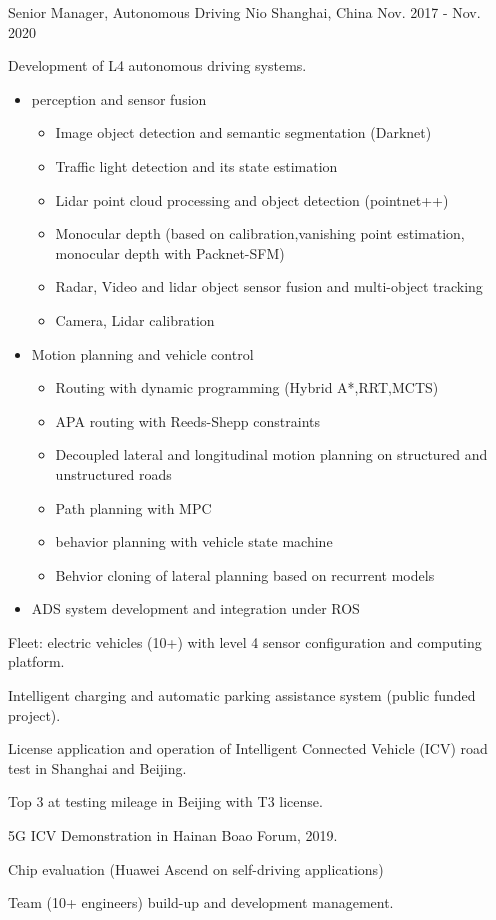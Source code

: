 \documentclass[../cv.tex]{subfiles}
\begin{document}
\begin{cventries}
	\cventry
	{Senior Manager, Autonomous Driving} %
	{Nio} %
	{Shanghai, China} %
	{Nov. 2017 - Nov. 2020} %
	{
		\begin{cvitems}
			\item Development of L4 autonomous driving systems.
			  \begin{itemize}
			    \item perception and sensor fusion
				  \begin{itemize}
					\item Image object detection and semantic segmentation (Darknet)
					\item Traffic light detection and its state estimation
					\item Lidar point cloud processing and object detection (pointnet++)
					\item Monocular depth (based on calibration,vanishing point estimation, monocular depth with Packnet-SFM)
				  	\item Radar, Video and lidar object sensor fusion and multi-object tracking
					\item Camera, Lidar calibration
				  \end{itemize}
			    \item Motion planning and vehicle control
				  \begin{itemize}
				  	\item Routing with dynamic programming (Hybrid A*,RRT,MCTS)
					\item APA routing with Reeds-Shepp constraints
					\item Decoupled lateral and longitudinal motion planning on structured and unstructured roads
					\item Path planning with MPC
					\item behavior planning with vehicle state machine
					\item Behvior cloning of lateral planning based on recurrent models
				  \end{itemize}
				\item ADS system development and integration under ROS
			\end{itemize}
			\item Fleet: electric vehicles (10+) with level 4 sensor configuration and computing platform.
			\item Intelligent charging and automatic parking assistance system (public funded project).
			\item License application and operation of Intelligent Connected Vehicle (ICV) road test in Shanghai and Beijing.
			\item Top 3 at testing mileage in Beijing with T3 license.
			\item 5G ICV Demonstration in Hainan Boao Forum, 2019.
			\item Chip evaluation (Huawei Ascend on self-driving applications)
			\item Team (10+ engineers) build-up and development management.
		\end{cvitems}
	}


\end{cventries}
\end{document}
